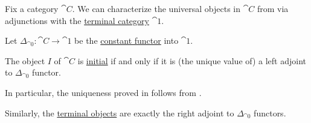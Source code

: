 \begin{proposition}\label{thm:universal_objects_as_adjunctions}
  Fix a category \( \cat{C} \). We can characterize the universal objects in \( \cat{C} \) from  via adjunctions with the \hyperref[def:universal_categories]{terminal category} \( \cat{1} \).

  Let \( \Delta_{\cat{0}}: \cat{C} \to \cat{1} \) be the \hyperref[def:diagonal_functor]{constant functor} into \( \cat{1} \).

  \begin{thmenum}
     The object \( I \) of \( \cat{C} \) is \hyperref[def:universal_objects]{initial} if and only if it is (the unique value of) a left adjoint to \( \Delta_{\cat{0}} \) functor.

    In particular, the uniqueness proved in  follows from .

     Similarly, the \hyperref[def:universal_objects]{terminal objects} are exactly the right adjoint to \( \Delta_{\cat{0}} \) functors.
  \end{thmenum}
\end{proposition}
